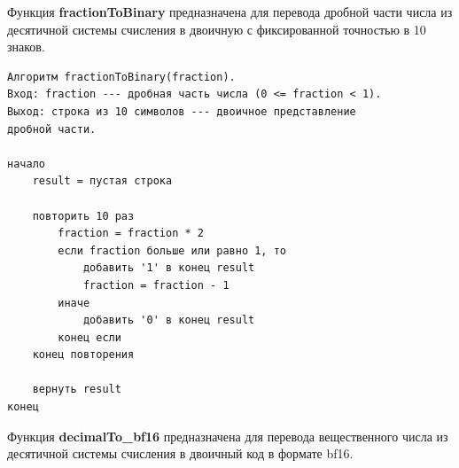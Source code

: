 Функция \textbf{fractionToBinary} предназначена для перевода
дробной части числа из десятичной системы
счисления в двоичную с фиксированной точностью в 10 знаков.

\begin{verbatim}
Алгоритм fractionToBinary(fraction).
Вход: fraction --- дробная часть числа (0 <= fraction < 1).
Выход: строка из 10 символов --- двоичное представление 
дробной части.

начало
    result = пустая строка

    повторить 10 раз
        fraction = fraction * 2
        если fraction больше или равно 1, то
            добавить '1' в конец result
            fraction = fraction - 1
        иначе
            добавить '0' в конец result
        конец если
    конец повторения

    вернуть result
конец
\end{verbatim}

Функция \textbf{decimalTo\_bf16} предназначена для перевода вещественного
числа из десятичной системы счисления в двоичный код в формате bf16.


